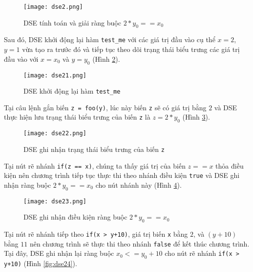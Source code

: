 \begin{figure}[H]
	\caption{DSE tính toán và giải ràng buộc $2*y_{0} == x_{0}$}
	\label{fig:dse2}
	\begin{center}
		\texttt{[image: dse2.png]}
	\end{center}	
\end{figure}

Sau đó, DSE khởi động lại hàm \texttt{test\_me} với các giá trị đầu vào cụ thể $x = 2$, $y = 1$ vừa tạo ra trước đó và tiếp tục theo dõi trạng thái biểu trưng các giá trị đầu vào với $x = x_{0}$ và $y = y_{0}$ (Hình \ref{fig:dse21}).

\begin{figure}[H]
	\caption{DSE khởi động lại hàm \texttt{test\_me}}
	\label{fig:dse21}
	\begin{center}
		\texttt{[image: dse21.png]}
	\end{center}		
\end{figure}


Tại câu lệnh gắn biến \texttt{z = foo(y)}, lúc này biến \texttt{z} sẽ có giá trị bằng $2$ và DSE thực hiện lưu trạng thái biểu trưng của biến \texttt{z} là $z = 2*y_{0}$ (Hình \ref{fig:dse22}).


\begin{figure}[H]
	\caption{DSE ghi nhận trạng thái biểu trưng của biến \texttt{z}}
	\label{fig:dse22}
	\begin{center}
		\texttt{[image: dse22.png]}
	\end{center}		
\end{figure}

Tại nút rẽ nhánh \texttt{if(z == x)}, chúng ta thấy giá trị của biến $ z == x $ thỏa điều kiện nên chương trình tiếp tục thực thi theo nhánh điều kiện \texttt{true} và DSE ghi nhận ràng buộc $2*y_{0} == x_{0}$ cho nút nhánh này (Hình \ref{fig:dse23}).

\begin{figure}[H]
	\caption{DSE ghi nhận điều kiện ràng buộc $2*y_{0} == x_{0}$}
	\label{fig:dse23}
	\begin{center}
		\texttt{[image: dse23.png]}
	\end{center}	
\end{figure}

Tại nút rẽ nhánh tiếp theo \texttt{if(x > y+10)}, giá trị biến \texttt{x} bằng $2$, và $(y + 10)$ bằng $11$ nên chương trình sẽ thực thi theo nhánh \texttt{false} để kết thúc chương trình. Tại đây, DSE ghi nhận lại ràng buộc $x_{0} <= y_{0} + 10$ cho nút rẽ nhánh \texttt{if(x > y+10)} (Hình \ref{fig:dse24}).

